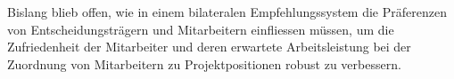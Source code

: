 Bislang blieb offen, wie in einem bilateralen Empfehlungssystem die Präferenzen von Entscheidungsträgern und Mitarbeitern einfliessen müssen, um die Zufriedenheit der Mitarbeiter und deren erwartete Arbeitsleistung bei der Zuordnung von Mitarbeitern zu Projektpositionen robust zu verbessern.






